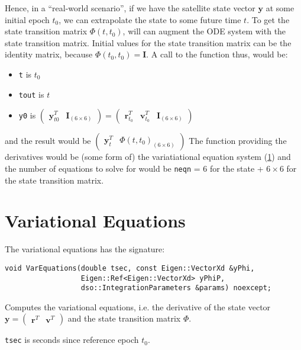 Hence, in a ``real-world scenario'', if we have the satellite state vector 
$\bm{y}$ at some initial epoch $t_0$, we can extrapolate the state to some 
future time $t$. To get the state transition matrix $\Phi (t,t_0)$, will can 
augment the ODE system with the state transition matrix. Initial values for 
the state transition matrix can be the identity matrix, because 
$\Phi (t_0,t_0) = \bm{I}$. A call to the function thus, would be:
\begin{itemize}
    \item \texttt{t} is $t_0$
    \item \texttt{tout} is $t$
    \item \texttt{y0} is 
    $\begin{pmatrix} \bm{y}^T_{t0} & \bm{I}_{(6 \times 6)} \end{pmatrix} = 
    \begin{pmatrix} \bm{r}^T_{t_0} & \bm{v}^T_{t_0} & \bm{I}_{(6 \times 6)} \end{pmatrix}$
\end{itemize}
and the result would be 
$\begin{pmatrix} \bm{y}^T_{t} & \Phi(t,t_0)_{(6 \times 6)} \end{pmatrix}$
The function providing the derivatives would be (some form of) the 
variatiational equation system (\ref{sec:variational-equations}) and the number 
of equations to solve for would be \texttt{neqn} = $6$ for the state + $6 \times 6$ for 
the state transition matrix.


\section{Variational Equations}
\label{sec:variational-equations}
The variational equations has the signature:

\begin{lstlisting}
void VarEquations(double tsec, const Eigen::VectorXd &yPhi,
                  Eigen::Ref<Eigen::VectorXd> yPhiP,
                  dso::IntegrationParameters &params) noexcept;
\end{lstlisting}

Computes the variational equations, i.e. the derivative of the state vector 
$\bm{y} = \begin{pmatrix}\bm{r}^T & \bm{v}^T \end{pmatrix}$ and the state 
transition matrix $\Phi$.

\texttt{tsec} is seconds since reference epoch $t_0$.

